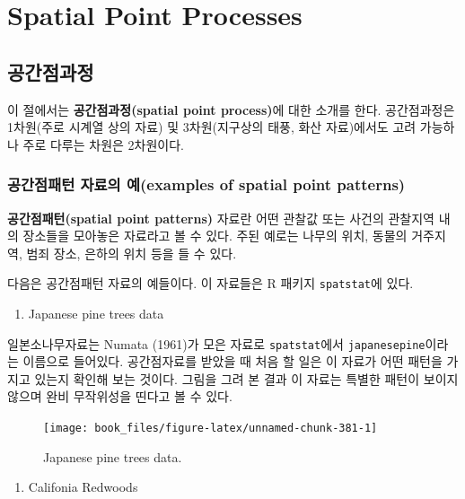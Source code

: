 \documentclass[b5paper,]{scrbook}
\providecommand{\tightlist}{%
  \setlength{\itemsep}{0pt}\setlength{\parskip}{0pt}}
\theoremstyle{plain}
\theoremstyle{definition}
\numberwithin{equation}{section}
\begin{document}
\hypertarget{part-spatial-point-processes}{%
\part{Spatial Point Processes}\label{part-spatial-point-processes}}

\hypertarget{pointpattern}{%
\chapter{공간점과정}\label{pointpattern}}

이 절에서는 \textbf{공간점과정(spatial point process)}에 대한 소개를 한다. 공간점과정은 1차원(주로 시계열 상의 자료) 및 3차원(지구상의 태풍, 화산 자료)에서도 고려 가능하나 주로 다루는 차원은 2차원이다.

\hypertarget{--examples-of-spatial-point-patterns}{%
\section{공간점패턴 자료의 예(examples of spatial point patterns)}\label{--examples-of-spatial-point-patterns}}

\textbf{공간점패턴(spatial point patterns)} 자료란 어떤 관찰값 또는 사건의 관찰지역 내의 장소들을 모아놓은 자료라고 볼 수 있다. 주된 예로는 나무의 위치, 동물의 거주지역, 범죄 장소, 은하의 위치 등을 들 수 있다.

다음은 공간점패턴 자료의 예들이다. 이 자료들은 R 패키지 \texttt{spatstat}에 있다.

\begin{enumerate}
\def\labelenumi{\arabic{enumi}.}
\tightlist
\item
  Japanese pine trees data
\end{enumerate}

일본소나무자료는 Numata (1961)가 모은 자료로 \texttt{spatstat}에서 \texttt{japanesepine}이라는 이름으로 들어있다. 공간점자료를 받았을 때 처음 할 일은 이 자료가 어떤 패턴을 가지고 있는지 확인해 보는 것이다. 그림을 그려 본 결과 이 자료는 특별한 패턴이 보이지 않으며 완비 무작위성을 띤다고 볼 수 있다.

\begin{figure}

{\centering \texttt{[image: book\_files/figure-latex/unnamed-chunk-381-1]} 

}

\caption{Japanese pine trees data.}\label{fig:unnamed-chunk-381}
\end{figure}

\begin{enumerate}
\def\labelenumi{\arabic{enumi}.}
\setcounter{enumi}{1}
\tightlist
\item
  Califonia Redwoods
\end{enumerate}
\end{document}
